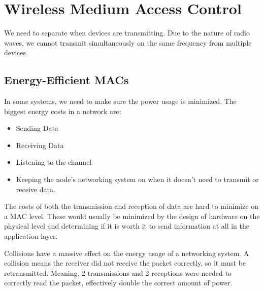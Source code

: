 \section{Wireless Medium Access Control}\label{sec:Wireless_MAC}
We need to separate when devices are transmitting.
Due to the nature of radio waves, we cannot transmit simultaneously on the same frequency from multiple devices.









\subsection{Energy-Efficient MACs}\label{subsec:Energy_Efficient_MACs}
In some systems, we need to make sure the power usage is minimized.
The biggest energy costs in a network are:
\begin{itemize}[noitemsep]
\item Sending Data
\item Receiving Data
\item Listening to the channel
\item Keeping the node's networking system on when it doesn't need to transmit or receive data.
\end{itemize}

\begin{remark*}
  The costs of both the transmission and reception of data are hard to minimize on a MAC level.
  These would usually be minimized by the design of hardware on the physical level and determining if it is worth it to send information at all in the application layer.
\end{remark*}

\begin{remark*}
  Collisions have a massive effect on the energy usage of a networking system.
  A collision means the receiver did not receive the packet correctly, so it must be retransmitted.
  Meaning, 2 transmissions and 2 receptions were needed to correctly read the packet, effectively double the correct amount of power.
\end{remark*}

